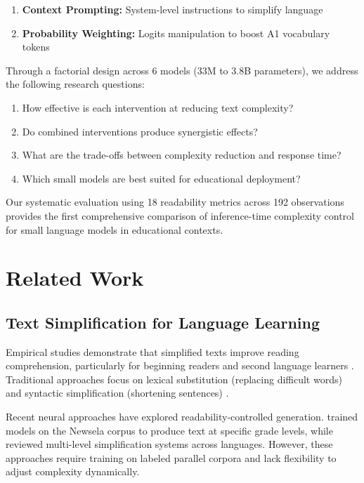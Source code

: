 \documentclass[10pt, a4paper]{article}
\begin{document}
\begin{enumerate}
\item \textbf{Context Prompting:} System-level instructions to simplify language
\item \textbf{Probability Weighting:} Logits manipulation to boost A1 vocabulary tokens
\end{enumerate}

Through a factorial design across 6 models (33M to 3.8B parameters), we address the following research questions:

\begin{enumerate}
\item How effective is each intervention at reducing text complexity?
\item Do combined interventions produce synergistic effects?
\item What are the trade-offs between complexity reduction and response time?
\item Which small models are best suited for educational deployment?
\end{enumerate}

Our systematic evaluation using 18 readability metrics across 192 observations provides the first comprehensive comparison of inference-time complexity control for small language models in educational contexts.

\section{Related Work}

\subsection{Text Simplification for Language Learning}

Empirical studies demonstrate that simplified texts improve reading comprehension, particularly for beginning readers \citep{Gala2018} and second language learners \citep{Crossley2011}. Traditional approaches focus on lexical substitution (replacing difficult words) and syntactic simplification (shortening sentences) \citep{Claridge2005}.

Recent neural approaches have explored readability-controlled generation. \citet{Al-Thanyyan2020} trained models on the Newsela corpus to produce text at specific grade levels, while \citet{Al-Sabbagh2023} reviewed multi-level simplification systems across languages. However, these approaches require training on labeled parallel corpora and lack flexibility to adjust complexity dynamically.
\end{document}
